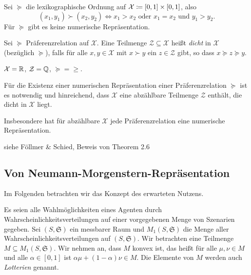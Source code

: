 \documentclass[a4paper,twoside,DIV15,BCOR12mm]{scrbook}
\newcommand{\cX}{\mathcal X}
\begin{document}
\begin{beispiel}
Sei $\succeq$ die lexikographische Ordnung auf $\cX \da [0, 1]\times[0, 1]$, also\[(x_1,y_1)\succ (x_2,y_2) \iff x_1 > x_2 \text{ oder } x_1 = x_2 \text{ und } y_1 > y_2.\] Für $\succeq$ gibt es keine numerische Repräsentation.
\end{beispiel}

\begin{definition}
Sei $\succeq$ Präferenzrelation auf $\cX$. Eine Teilmenge $\mathcal Z\subseteq \mathcal X$ heißt \emph{dicht} in $\cX$ (bezüglich $\succeq$), falls für alle $x,y\in\cX$ mit $x\succ y$ ein $z\in\mathcal Z$ gibt, so dass $x\succeq z \succeq y$.
\end{definition}

\begin{beispiel}
$\cX = \MdR$, $\mathcal Z=\mathbb{Q}$, $\succeq = \ge$.
\end{beispiel}

\begin{satz}
Für die Existenz einer numerischen Repräsentation einer Präferenzrelation $\succeq$ ist es notwendig und hinreichend, dass $\cX$ eine abzählbare Teilmenge $\mathcal Z$ enthält, die dicht in $\cX$ liegt.

Insbesondere hat für abzählbare $\cX$ jede Präferenzrelation eine numerische Repräsentation.
\end{satz}

\begin{beweis}
siehe Föllmer \& Schied, Beweis von Theorem 2.6
\end{beweis}

\subsection{Von Neumann-Morgenstern-Repräsentation}

Im Folgenden betrachten wir das Konzept des erwarteten Nutzens.

Es seien alle Wahlmöglichkeiten eines Agenten durch Wahrscheinlichkeitsverteilungen auf einer vorgegebenen Menge von Szenarien gegeben. Sei $(S,\mathfrak S)$ ein messbarer Raum und $M_1(S,\mathfrak S)$ die Menge aller Wahrscheinlichkeitsverteilungen auf $(S,\mathfrak S)$. Wir betrachten eine Teilmenge $M\subseteq M_1(S,\mathfrak S)$. Wir nehmen an, dass $M$ konvex ist, das heißt für alle $\mu, \nu\in M$ und alle $\alpha\in[0, 1]$ ist $\alpha\mu + (1-\alpha)\nu \in M$. Die Elemente von $M$ werden auch \emph{Lotterien} genannt.
\end{document}

